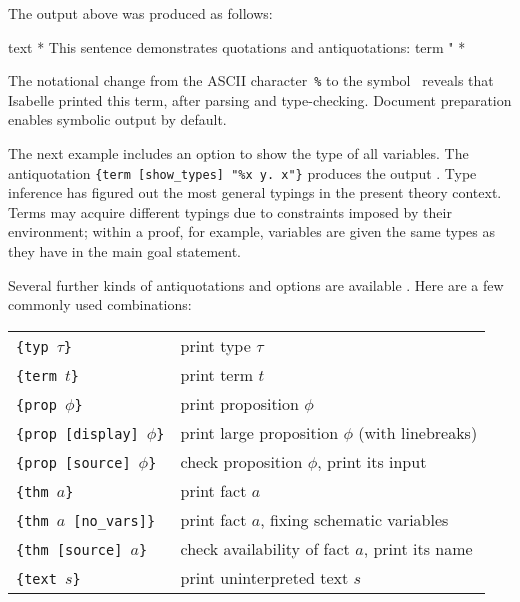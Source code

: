 \begin{isabellebody}
\begin{isamarkuptext}
  \medskip\noindent The output above was produced as follows:
  \begin{ttbox}
text {\ttlbrace}*
  This sentence demonstrates quotations and antiquotations:
  {\at}{\ttlbrace}term "%
*{\ttrbrace}
  \end{ttbox}\vspace{-\medskipamount}

  The notational change from the ASCII character~\verb,%, to the
  symbol~\isa{{\isasymlambda}} reveals that Isabelle printed this term, after
  parsing and type-checking.  Document preparation enables symbolic
  output by default.

  \medskip The next example includes an option to show the type of all
  variables.  The antiquotation
  \texttt{{\at}}\verb,{term [show_types] "%x y. x"}, produces the
  output .  Type inference has figured
  out the most general typings in the present theory context.  Terms
  may acquire different typings due to constraints imposed by their
  environment; within a proof, for example, variables are given the
  same types as they have in the main goal statement.

  \medskip Several further kinds of antiquotations and options are
  available \cite{isabelle-sys}.  Here are a few commonly used
  combinations:

  \medskip

  \begin{tabular}{ll}
  \texttt{\at}\verb,{typ,~$\tau$\verb,}, & print type $\tau$ \\
  \texttt{\at}\verb,{term,~$t$\verb,}, & print term $t$ \\
  \texttt{\at}\verb,{prop,~$\phi$\verb,}, & print proposition $\phi$ \\
  \texttt{\at}\verb,{prop [display],~$\phi$\verb,}, & print large proposition $\phi$ (with linebreaks) \\
  \texttt{\at}\verb,{prop [source],~$\phi$\verb,}, & check proposition $\phi$, print its input \\
  \texttt{\at}\verb,{thm,~$a$\verb,}, & print fact $a$ \\
  \texttt{\at}\verb,{thm,~$a$~\verb,[no_vars]}, & print fact $a$, fixing schematic variables \\
  \texttt{\at}\verb,{thm [source],~$a$\verb,}, & check availability of fact $a$, print its name \\
  \texttt{\at}\verb,{text,~$s$\verb,}, & print uninterpreted text $s$ \\
  \end{tabular}


\end{isamarkuptext}
\end{isabellebody}
